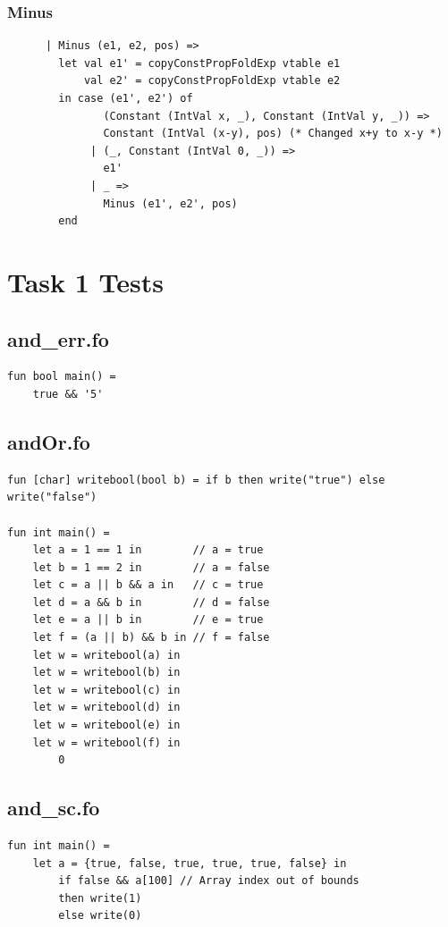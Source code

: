 \documentclass[11pt]{article}
\begin{document}
   	\subsubsection{Minus} \label{ccpfvar}
	\begin{lstlisting}
      | Minus (e1, e2, pos) =>
        let val e1' = copyConstPropFoldExp vtable e1
            val e2' = copyConstPropFoldExp vtable e2
        in case (e1', e2') of
               (Constant (IntVal x, _), Constant (IntVal y, _)) =>
               Constant (IntVal (x-y), pos) (* Changed x+y to x-y *)
             | (_, Constant (IntVal 0, _)) =>
               e1'
             | _ =>
               Minus (e1', e2', pos)
        end
    \end{lstlisting}
    
    \newpage
    \section{Task 1 Tests} \label{task_1_tests}
    \subsection{and\_err.fo}
    \begin{lstlisting}
fun bool main() =
    true && '5'
    \end{lstlisting}

    \subsection{andOr.fo}
    \begin{lstlisting}
fun [char] writebool(bool b) = if b then write("true") else write("false")

fun int main() =
    let a = 1 == 1 in        // a = true
    let b = 1 == 2 in        // a = false
    let c = a || b && a in   // c = true
    let d = a && b in        // d = false
    let e = a || b in        // e = true
    let f = (a || b) && b in // f = false
    let w = writebool(a) in
    let w = writebool(b) in
    let w = writebool(c) in
    let w = writebool(d) in
    let w = writebool(e) in
    let w = writebool(f) in
        0
    \end{lstlisting}

    \subsection{and\_sc.fo}
    \begin{lstlisting}
fun int main() =
    let a = {true, false, true, true, true, false} in
        if false && a[100] // Array index out of bounds
        then write(1)
        else write(0)
    \end{lstlisting}
\end{document}
